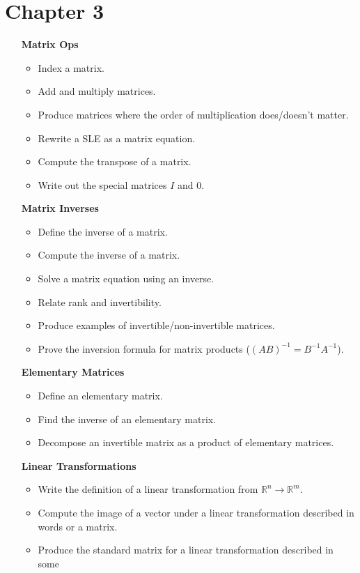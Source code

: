 \documentclass[letter]{article}
\newcommand{\R}{\mathbb{R}}
\begin{document}
	\section*{Chapter 3}
	\begin{enumerate}
		\item[\bf Matrix Ops] 
			\begin{itemize}
				\item Index a matrix.
				\item Add and multiply matrices.
				\item Produce matrices where the order of multiplication does/doesn't matter.
				\item Rewrite a SLE as a matrix equation.
				\item Compute the transpose of a matrix.
				\item Write out the special matrices $I$ and $0$.
			\end{itemize}
		\item[\bf Matrix Inverses] 
			\begin{itemize}
				\item Define the inverse of a matrix.
				\item Compute the inverse of a matrix.
				\item Solve a matrix equation using an inverse.
				\item Relate rank and invertibility.
				\item Produce examples of invertible/non-invertible matrices.
				\item Prove the inversion formula for matrix products ($(AB)^{-1}=B^{-1}A^{-1}$).
			\end{itemize}
		\item[\bf Elementary Matrices] 
			\begin{itemize}
				\item Define an elementary matrix.
				\item Find the inverse of an elementary matrix.
				\item Decompose an invertible matrix as a product of elementary matrices.
			\end{itemize}
		\item[\bf Linear Transformations] 
			\begin{itemize}
				\item Write the definition of a linear transformation from $\R^n\to\R^m$.
				\item Compute the image of a vector under a linear transformation described in
					words or a matrix.
				\item Produce the standard matrix for a linear transformation described in some

\end{itemize}
\end{enumerate}
\end{document}
